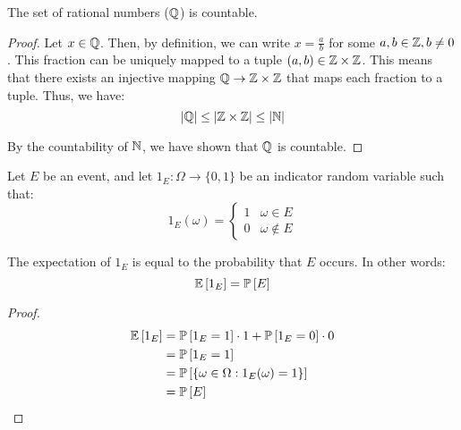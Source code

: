 \documentclass[name=Ojas\ Chaturvedi, emailid=oj.chaturvedi.2024, course=Course\ Name, num=1, deadline=Enter\ Deadline\ Here]{homework}
\begin{document}
    

\begin{claim}
    The set of rational numbers ($\mathbb{Q}$) is countable.
\end{claim}
\begin{proof}
    Let $x \in \mathbb{Q}$. Then, by definition, we can write $x = \frac{a}{b}$ for some $a, b \in \mathbb{Z}, b \neq 0$. This fraction can be uniquely mapped to a tuple $(a, b) \in \mathbb{Z} \times \mathbb{Z}$. This means that there exists an injective mapping $\mathbb{Q} \to \mathbb{Z} \times \mathbb{Z}$ that maps each fraction to a tuple. Thus, we have:
    $$ |\mathbb{Q}| \leq |\mathbb{Z} \times \mathbb{Z}| \leq |\mathbb{N}| $$
    
    By the countability of $\mathbb{N}$, we have shown that $\mathbb{Q}$ is countable.
\end{proof}

\separator

Let $E$ be an event, and let $1_E : \Omega \to \{ 0, 1 \}$ be an indicator random variable such that:
$$ 1_E(\omega) = \begin{cases}
1 & \omega \in E \\
0 & \omega \notin E
\end{cases} $$

\begin{claim}
    The expectation of $1_E$ is equal to the probability that $E$ occurs. In other words:
    $$ \mathbb{E}\left[ 1_E \right] = \mathbb{P}\left[ E \right] $$
\end{claim}
\begin{proof}
    \begin{align*}
    \mathbb{E}\left[ 1_E \right] &= \mathbb{P}\left[ 1_E = 1 \right] \cdot 1 + \mathbb{P}\left[ 1_E = 0 \right] \cdot 0 \\
    &= \mathbb{P}\left[ 1_E = 1 \right] \\
    &= \mathbb{P}\left[  \{ \omega \in \Omega : 1_E(\omega) = 1 \}  \right] \\
    &= \mathbb{P}\left[ E \right]
    \end{align*}
\end{proof}
\newpage

\end{document}
